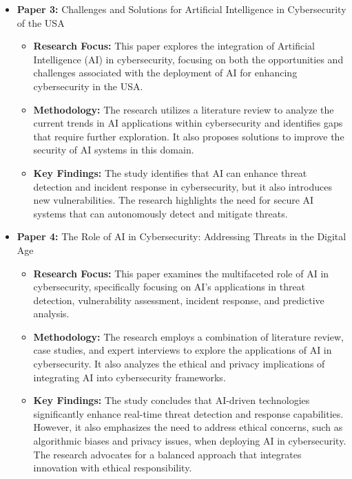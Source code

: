 \documentclass[12pt,a4paper]{article}
\begin{document}
\begin{itemize}
\begin{itemize}
    \end{itemize}
    \vspace{0.2cm}
    \item \textbf{Paper 3:} Challenges and Solutions for Artificial Intelligence in Cybersecurity of the USA \cite{Soni2020}
    \begin{itemize}
        \item \textbf{Research Focus:} This paper explores the integration of Artificial Intelligence (AI) in cybersecurity, focusing on both the opportunities and challenges associated with the deployment of AI for enhancing cybersecurity in the USA.
        \item \textbf{Methodology:} The research utilizes a literature review to analyze the current trends in AI applications within cybersecurity and identifies gaps that require further exploration. It also proposes solutions to improve the security of AI systems in this domain.
        \item \textbf{Key Findings:} The study identifies that AI can enhance threat detection and incident response in cybersecurity, but it also introduces new vulnerabilities. The research highlights the need for secure AI systems that can autonomously detect and mitigate threats.
    \end{itemize}
    \vspace{0.2cm}
    \item \textbf{Paper 4:} The Role of AI in Cybersecurity: Addressing Threats in the Digital Age \cite{Camacho2024}
    \begin{itemize}
        \item \textbf{Research Focus:} This paper examines the multifaceted role of AI in cybersecurity, specifically focusing on AI’s applications in threat detection, vulnerability assessment, incident response, and predictive analysis.
        \item \textbf{Methodology:} The research employs a combination of literature review, case studies, and expert interviews to explore the applications of AI in cybersecurity. It also analyzes the ethical and privacy implications of integrating AI into cybersecurity frameworks.
        \item \textbf{Key Findings:} The study concludes that AI-driven technologies significantly enhance real-time threat detection and response capabilities. However, it also emphasizes the need to address ethical concerns, such as algorithmic biases and privacy issues, when deploying AI in cybersecurity. The research advocates for a balanced approach that integrates innovation with ethical responsibility.
    \end{itemize}
\end{itemize}
\end{document}
